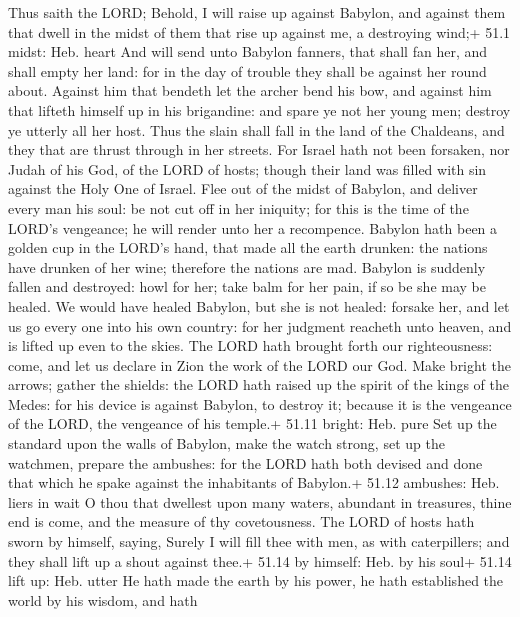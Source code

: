  Thus saith the LORD; Behold, I will raise up against
Babylon, and against them that dwell in the midst of them that rise up
against me, a destroying wind;+ 51.1 midst: Heb. heart  And
will send unto Babylon fanners, that shall fan her, and shall empty her
land: for in the day of trouble they shall be against her round about.
 Against him that bendeth let the archer bend his bow, and
against him that lifteth himself up in his brigandine: and spare ye not
her young men; destroy ye utterly all her host.  Thus the
slain shall fall in the land of the Chaldeans, and they that are thrust
through in her streets.  For Israel hath not been forsaken,
nor Judah of his God, of the LORD of hosts; though their land was filled
with sin against the Holy One of Israel.  Flee out of the
midst of Babylon, and deliver every man his soul: be not cut off in her
iniquity; for this is the time of the LORD's vengeance; he will render
unto her a recompence.  Babylon hath been a golden cup in
the LORD's hand, that made all the earth drunken: the nations have
drunken of her wine; therefore the nations are mad.  Babylon
is suddenly fallen and destroyed: howl for her; take balm for her pain,
if so be she may be healed.  We would have healed Babylon,
but she is not healed: forsake her, and let us go every one into his own
country: for her judgment reacheth unto heaven, and is lifted up even to
the skies.  The LORD hath brought forth our righteousness:
come, and let us declare in Zion the work of the LORD our God.
 Make bright the arrows; gather the shields: the LORD hath
raised up the spirit of the kings of the Medes: for his device is
against Babylon, to destroy it; because it is the vengeance of the LORD,
the vengeance of his temple.+ 51.11 bright: Heb. pure  Set
up the standard upon the walls of Babylon, make the watch strong, set up
the watchmen, prepare the ambushes: for the LORD hath both devised and
done that which he spake against the inhabitants of Babylon.+ 51.12
ambushes: Heb. liers in wait  O thou that dwellest upon
many waters, abundant in treasures, thine end is come, and the measure
of thy covetousness.  The LORD of hosts hath sworn by
himself, saying, Surely I will fill thee with men, as with caterpillers;
and they shall lift up a shout against thee.+ 51.14 by himself: Heb. by
his soul+ 51.14 lift up: Heb. utter  He hath made the earth
by his power, he hath established the world by his wisdom, and hath
